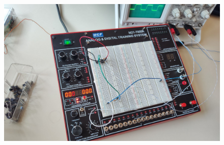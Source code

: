 \documentclass[12pt]{article}
\begin{document}
\begin{figure}[H]
	\centering
	\includegraphics[width=\linewidth]{./res/breadboard.png}
\end{figure}
\end{document}

